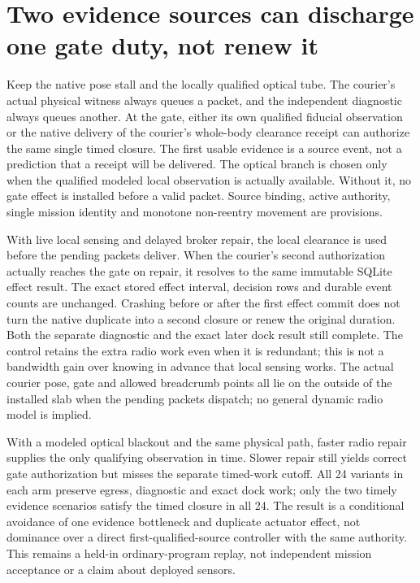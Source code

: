 \documentclass{article}
\begin{document}
\section*{Two evidence sources can discharge one gate duty, not renew it}
Keep the native pose stall and the locally qualified optical tube.
The courier's actual physical witness always queues a packet, and
the independent diagnostic always queues another. At the gate,
either its own qualified fiducial observation or the native delivery
of the courier's whole-body clearance receipt can authorize the same
single timed closure. The first usable evidence is a source event,
not a prediction that a receipt will be delivered. The optical
branch is chosen only when the qualified modeled local observation
is actually available. Without it, no gate effect is installed
before a valid packet. Source binding, active authority, single
mission identity and monotone non-reentry movement are provisions.

With live local sensing and delayed broker repair, the local
clearance is used before the pending packets deliver. When the
courier's second authorization actually reaches the gate on
repair, it resolves to the same immutable SQLite effect result.
The exact stored effect interval, decision rows and durable event
counts are unchanged. Crashing before or after the first effect
commit does not turn the native duplicate into a second closure
or renew the original duration. Both the separate diagnostic and
the exact later dock result still complete. The control retains
the extra radio work even when it is redundant; this is not a
bandwidth gain over knowing in advance that local sensing works.
The actual courier pose, gate and allowed breadcrumb points all
lie on the outside of the installed slab when the pending packets
dispatch; no general dynamic radio model is implied.

With a modeled optical blackout and the same physical path, faster
radio repair supplies the only qualifying observation in time.
Slower repair still yields correct gate authorization but misses
the separate timed-work cutoff. All 24 variants in each arm
preserve egress, diagnostic and exact dock work; only the two
timely evidence scenarios satisfy the timed closure in all 24.
The result is a conditional avoidance of one evidence bottleneck
and duplicate actuator effect, not dominance over a direct
first-qualified-source controller with the same authority.
This remains a held-in ordinary-program replay, not independent
mission acceptance or a claim about deployed sensors.
\end{document}
